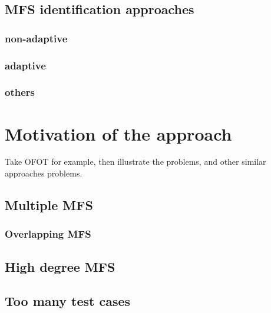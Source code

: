 \documentclass[10pt,journal,cspaper,compsoc]{IEEEtran}
\begin{document}
%
%


\subsection{MFS identification approaches}
\subsubsection{non-adaptive}
\subsubsection{adaptive}
\subsubsection{others}

\section{Motivation of the approach}\label{sec:motiv}

Take OFOT for example, then illustrate the problems, and other similar approaches problems.

\subsection{Multiple MFS}
\subsubsection{Overlapping MFS}
\subsection{High degree MFS}
\subsection{Too many test cases}
\end{document}
